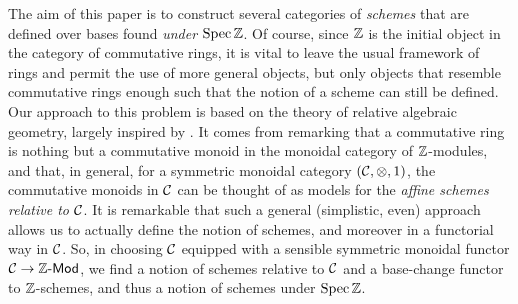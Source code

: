     \begin{translation}{1}{1}
        The aim of this paper is to construct several categories of \emph{schemes} that are defined over bases found \emph{under $\operatorname{Spec}\mathbb{Z}$}.
        Of course, since $\mathbb{Z}$ is the initial object in the category of commutative rings, it is vital to leave the usual framework of rings and permit the use of more general objects, but only objects that  resemble commutative rings enough such that the notion of a scheme can still be defined.
        Our approach to this problem is based on the theory of relative algebraic geometry, largely inspired by \cite{Hakim:XPnOZC1P}.
        It comes from remarking that a commutative ring is nothing but a commutative monoid in the monoidal category of $\mathbb{Z}$-modules, and that, in general, for a symmetric monoidal category $(\mathcal{C},\otimes,1)$, the commutative monoids in $\mathcal{C}$ can be thought of as models for the \emph{affine schemes relative to $\mathcal{C}$}.
        It is remarkable that such a general (simplistic, even) approach allows us to actually define the notion of schemes, and moreover in a functorial way in $\mathcal{C}$.
        So, in choosing $\mathcal{C}$ equipped with a sensible symmetric monoidal functor $\mathcal{C}\to{{\mathbb{Z}}\hbox{-}\mathsf{Mod}}$, we find a notion of schemes relative to $\mathcal{C}$ and a base-change functor to $\mathbb{Z}$-schemes, and thus a notion of schemes under $\operatorname{Spec}\mathbb{Z}$.
    \end{translation}


